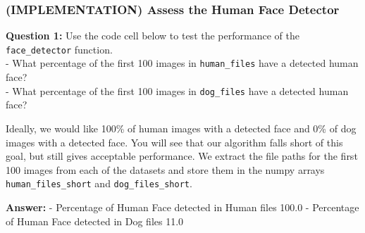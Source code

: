 \documentclass[11pt]{article}
\begin{document}
    \hypertarget{implementation-assess-the-human-face-detector}{%
\subsubsection{(IMPLEMENTATION) Assess the Human Face
Detector}\label{implementation-assess-the-human-face-detector}}

\textbf{Question 1:} Use the code cell below to test the performance of
the \texttt{face\_detector} function.\\
- What percentage of the first 100 images in \texttt{human\_files} have
a detected human face?\\
- What percentage of the first 100 images in \texttt{dog\_files} have a
detected human face?

Ideally, we would like 100\% of human images with a detected face and
0\% of dog images with a detected face. You will see that our algorithm
falls short of this goal, but still gives acceptable performance. We
extract the file paths for the first 100 images from each of the
datasets and store them in the numpy arrays \texttt{human\_files\_short}
and \texttt{dog\_files\_short}.

\textbf{Answer:} - Percentage of Human Face detected in Human files
100.0 - Percentage of Human Face detected in Dog files 11.0
\end{document}
